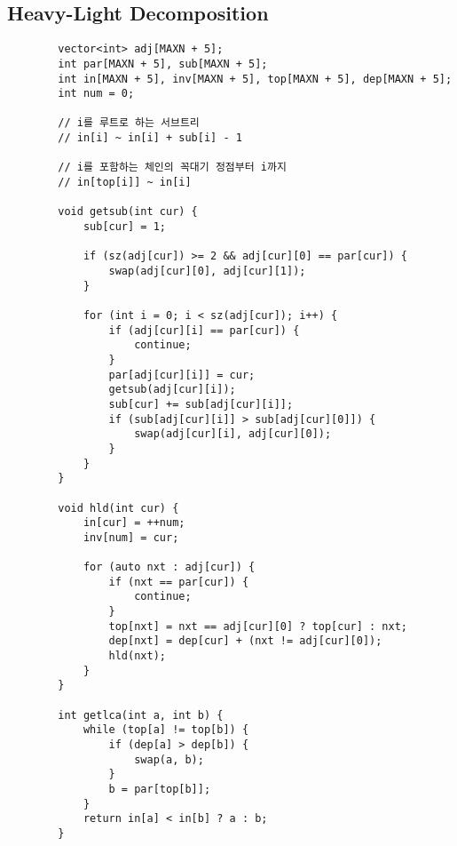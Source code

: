 \documentclass[landscape, 8pt, a4paper, oneside, twocolumn]{extarticle}
\begin{document}
	\subsection {Heavy-Light Decomposition}
	\begin{verbatim}
		vector<int> adj[MAXN + 5];
		int par[MAXN + 5], sub[MAXN + 5];
		int in[MAXN + 5], inv[MAXN + 5], top[MAXN + 5], dep[MAXN + 5];
		int num = 0;

		// i를 루트로 하는 서브트리
		// in[i] ~ in[i] + sub[i] - 1
		
		// i를 포함하는 체인의 꼭대기 정점부터 i까지
		// in[top[i]] ~ in[i]
		
		void getsub(int cur) {
			sub[cur] = 1;
			
			if (sz(adj[cur]) >= 2 && adj[cur][0] == par[cur]) {
				swap(adj[cur][0], adj[cur][1]);
			}
			
			for (int i = 0; i < sz(adj[cur]); i++) {
				if (adj[cur][i] == par[cur]) {
					continue;
				}
				par[adj[cur][i]] = cur;
				getsub(adj[cur][i]);
				sub[cur] += sub[adj[cur][i]];
				if (sub[adj[cur][i]] > sub[adj[cur][0]]) {
					swap(adj[cur][i], adj[cur][0]);
				}
			}
		}
		
		void hld(int cur) {
			in[cur] = ++num;
			inv[num] = cur;
			
			for (auto nxt : adj[cur]) {
				if (nxt == par[cur]) {
					continue;
				}
				top[nxt] = nxt == adj[cur][0] ? top[cur] : nxt;
				dep[nxt] = dep[cur] + (nxt != adj[cur][0]);
				hld(nxt);
			}
		}
		
		int getlca(int a, int b) {
			while (top[a] != top[b]) {
				if (dep[a] > dep[b]) {
					swap(a, b);
				}
				b = par[top[b]];
			}
			return in[a] < in[b] ? a : b;
		}
	\end{verbatim}
\end{document}

